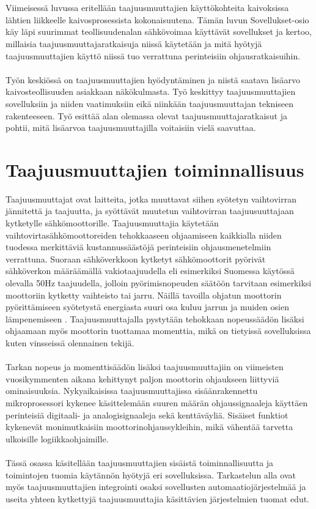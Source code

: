 \documentclass[finnish,12pt,a4paper,pdftex,elec,utf8]{aaltothesis}
\begin{document}
\\\\
Viimeisessä luvussa eritellään taajuusmuuttajien käyttökohteita kaivoksissa lähtien liikkeelle kaivosprosessista kokonaisuutena. Tämän luvun Sovellukset-osio käy läpi suurimmat teollisuudenalan sähkövoimaa käyttävät sovellukset ja kertoo, millaisia taajuusmuuttajaratkaisuja niissä käytetään ja mitä hyötyjä taajuusmuuttajien käyttö niissä tuo verrattuna perinteisiin ohjausratkaisuihin.
\\\\
Työn keskiössä on taajuusmuuttajien hyödyntäminen ja niistä saatava lisäarvo kaivosteollisuuden asiakkaan näkökulmasta. Työ keskittyy taajuusmuuttajien sovelluksiin ja niiden vaatimuksiin eikä niinkään taajuusmuuttajan tekniseen rakenteeseen. Työ esittää alan olemassa olevat taajuusmuuttajaratkaisut ja pohtii, mitä lisäarvoa taajuusmuuttajilla voitaisiin vielä saavuttaa.
\clearpage

\section{{\large Taajuusmuuttajien toiminnallisuus}}
Taajuusmuuttajat ovat laitteita, jotka muuttavat siihen syötetyn vaihtovirran jännitettä ja taajuutta, ja syöttävät muutetun vaihtovirran taajuusuuttajaan kytketylle sähkömoottorille. Taajuusmuuttajia käytetään vaihtovirtasähkömoottoreiden tehokkaaseen ohjaamiseen kaikkialla niiden tuodessa merkittäviä kustannussäästöjä perinteisiin ohjausmenetelmiin verrattuna. Suoraan sähköverkkoon kytketyt sähkömoottorit pyörivät sähköverkon määräämällä vakiotaajuudella eli esimerkiksi Suomessa käytössä olevalla 50Hz taajuudella, jolloin pyörimisnopeuden säätöön tarvitaan esimerkiksi moottoriin kytketty vaihteisto tai jarru. Näillä tavoilla ohjatun moottorin pyörittämiseen syötetystä energiasta suuri osa kuluu jarrun ja muiden osien lämpenemiseen \cite{ABBinmining}. Taajuusmuuttajalla pystytään tehokkaan nopeussäädön lisäksi ohjaamaan myös moottorin tuottamaa momenttia, mikä on tietyissä sovelluksissa kuten vinsseissä olennainen tekijä.
\\\\
Tarkan nopeus ja momenttisäädön lisäksi taajuusmuuttajiin on viimeisten vuosikymmenten aikana kehittynyt paljon moottorin ohjaukseen liittyviä ominaisuuksia. Nykyaikaisissa taajuusmuuttajissa sisäänrakennettu mikroprosessori kykenee käsittelemään suuren määrän ohjaussignaaleja käyttäen perinteisiä digitaali- ja analogisignaaleja sekä kenttäväyliä. Sisäiset funktiot kykenevät monimutkaisiin moottorinohjaussykleihin, mikä vähentää tarvetta ulkoisille logiikkaohjaimille. \cite{ABBtechnicalguide}
\\\\
Tässä osassa käsitellään taajuusmuuttajien sisäistä toiminnallisuutta ja toimintojen tuomia käytännön hyötyjä eri sovelluksissa. Tarkastelun alla ovat myös taajuusmuuttajien integrointi osaksi sovellusten automaatiojärjestelmää ja useita yhteen kytkettyjä taajuusmuuttajia käsittävien järjestelmien tuomat edut.
\end{document}
